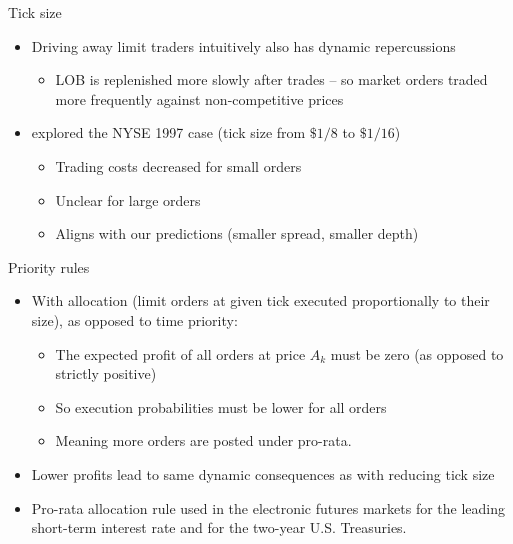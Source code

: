 \documentclass[english,10pt]{beamer}
\begin{document}
\begin{frame}{Tick size}
	\begin{itemize}
		\item Driving away limit traders intuitively also has dynamic repercussions
		\begin{itemize}
			\item LOB is replenished more slowly after trades -- so market orders traded more frequently against non-competitive prices
		\end{itemize}
		\item \cite{goldstein_eighths_2000} explored the NYSE 1997 case (tick size from $\$1/8$ to $\$1/16$)
		\begin{itemize}
			\item Trading costs decreased for small orders
			\item Unclear for large orders
			\item Aligns with our predictions (smaller spread, smaller depth)
		\end{itemize}
	\end{itemize}
\end{frame}


\begin{frame}{Priority rules}
	\begin{itemize}
		\item With  allocation (limit orders at given tick executed proportionally to their size), as opposed to \alert{time priority}:
		\begin{itemize}
			\item The expected profit of all orders at price $A_k$ must be zero (as opposed to strictly positive)
			\item So execution probabilities must be lower for all orders
			\item Meaning more orders are posted under pro-rata.
		\end{itemize}
		\item Lower profits lead to same dynamic consequences as with reducing tick size
		\item Pro-rata allocation rule used in the electronic futures markets for the leading short-term interest rate and for the two-year U.S. Treasuries.
	\end{itemize}
\end{frame}
\end{document}
